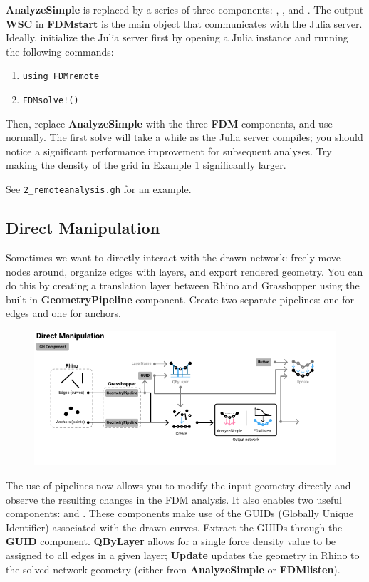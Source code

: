 \textbf{AnalyzeSimple} is replaced by a series of three components: , , and . The output \textbf{WSC} in \textbf{FDMstart} is the main object that communicates with the Julia server. Ideally, initialize the Julia server first by opening a Julia instance and running the following commands:
\begin{enumerate}
    \item \texttt{using FDMremote}
    \item \texttt{FDMsolve!()}
\end{enumerate} 

Then, replace \textbf{AnalyzeSimple} with the three \textbf{FDM} components, and use normally. The first solve will take a while as the Julia server compiles; you should notice a significant performance improvement for subsequent analyses. Try making the density of the grid in Example 1 significantly larger. 

\vspace{2em}

See \texttt{2\_remoteanalysis.gh} for an example.

\newpage
\subsection{Direct Manipulation}
Sometimes we want to directly interact with the drawn network: freely move nodes around, organize edges with layers, and export rendered geometry. You can do this by creating a translation layer between Rhino and Grasshopper using the built in \textbf{GeometryPipeline} component. Create two separate pipelines: one for edges and one for anchors.

\begin{figure}[h]
    \centering
    \includegraphics*[width=\textwidth]{Figures/direct}
\end{figure}

The use of pipelines now allows you to modify the input geometry directly and observe the resulting changes in the FDM analysis. It also enables two useful components:  and . These components make use of the GUIDs (Globally Unique Identifier) associated with the drawn curves. Extract the GUIDs through the \textbf{GUID} component. \textbf{QByLayer} allows for a single force density value to be assigned to all edges in a given layer; \textbf{Update} updates the geometry in Rhino to the solved network geometry (either from \textbf{AnalyzeSimple} or \textbf{FDMlisten}).

